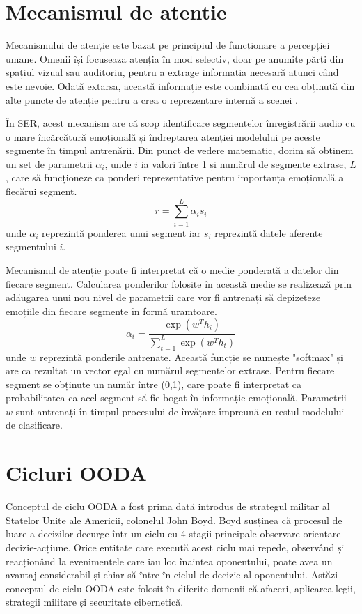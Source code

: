 \documentclass[a4paper,12pt]{book}
\begin{document}
				\section{Mecanismul de atentie} \label{attention}
				 Mecanismului de atenție este bazat  pe principiul de funcționare a percepției umane. Omenii  își focuseaza atenția în mod selectiv, doar pe anumite părți din spațiul vizual sau auditoriu, pentru a extrage informația necesară atunci când este nevoie. Odată extarsa, această informație este combinată cu cea obținută din alte puncte de atenție pentru a crea o reprezentare internă a scenei \cite{zhang, attention1}. \par
				 În SER, acest mecanism are că scop identificare segmentelor înregistrării audio cu o mare încărcătură emoțională și îndreptarea atenției modelului pe aceste segmente în timpul antrenării. Din punct de vedere matematic, dorim să obținem un set de parametrii $\alpha_i$, unde $i$ ia valori între 1 și numărul de segmente extrase, $L$, care să funcționeze ca ponderi reprezentative pentru importanța emoțională a fiecărui segment.
				\begin{equation}
					r = \sum_{i=1}^{L} \alpha_i s_i
				\end{equation}
				unde $\alpha_i$ reprezintă ponderea unui segment iar $s_i$ reprezintă datele aferente segmentului $i$. \par
				Mecanismul de atenție poate fi interpretat că o medie ponderată a datelor din fiecare segment. Calcularea ponderilor folosite în această medie se realizează prin adăugarea unui nou nivel de parametrii care vor fi antrenați să depizeteze emoțiile din fiecare segmente în formă uramtoare.
				\begin{equation} \label{softmax_form}
					\alpha_i = \frac{\exp(w^Th_i)}{\sum_{t=1}^{L} \exp(w^Th_t)}
				\end{equation}
				unde $w$ reprezintă ponderile antrenate.
				Această funcție se numește "softmax" și are ca rezultat un vector egal cu numărul segmentelor extrase. Pentru fiecare segment se obținute un număr între (0,1), care poate fi interpretat ca probabilitatea ca acel segment să fie bogat în informație emoțională.  Parametrii $w$ sunt antrenați în timpul procesului de învățare împreună cu restul modelului de clasificare.
			
				\section{Cicluri OODA} \label{ooda}
				 Conceptul de ciclu OODA a fost prima dată introdus de strategul militar al Statelor Unite ale Americii, colonelul John Boyd. Boyd susținea că procesul de luare a decizilor decurge într-un ciclu cu 4 stagii principale observare-orientare-decizie-acțiune. Orice entitate care execută acest ciclu mai repede, observând și reacționând la evenimentele care iau loc înaintea oponentului, poate avea un avantaj considerabil și chiar să între în ciclul de decizie al oponentului. Astăzi conceptul de ciclu OODA este folosit în diferite domenii că afaceri, aplicarea legii, strategii militare și securitate cibernetică. \par
				 
\end{document}
